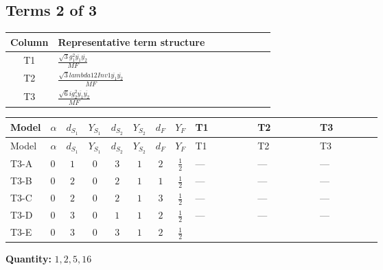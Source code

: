 \documentclass[8pt]{article}
\begin{document}
\begin{landscape}
\subsection*{Terms 2 of 3}
\begin{center}
\begin{tabular}{@{}c >{\raggedright\arraybackslash}p{0.82\linewidth}@{}}
\toprule
Column & Representative term structure \\
\midrule
T1 & \(\displaystyle \frac{\sqrt{3} g_{1}^{2} \overline{y_{1}} \overline{y_{2}}}{MF}\) \\
\midrule
T2 & \(\displaystyle \frac{\sqrt{3} lambda12Inv1 \overline{y_{1}} \overline{y_{2}}}{MF}\) \\
\midrule
T3 & \(\displaystyle \frac{\sqrt{6} i g_{2}^{2} \overline{y_{1}} \overline{y_{2}}}{MF}\) \\
\midrule
\bottomrule
\end{tabular}
\end{center}
\smallskip
\tiny
\begin{longtable}{@{}llcccccc >{\raggedright\arraybackslash}p{0.21\linewidth} >{\raggedright\arraybackslash}p{0.21\linewidth} >{\raggedright\arraybackslash}p{0.21\linewidth}@{}}
\toprule
Model & $\alpha$ & $d_{S_1}$ & $Y_{S_1}$ & $d_{S_2}$ & $Y_{S_2}$ & $d_F$ & $Y_F$ & T1 & T2 & T3 \\
\midrule
\endfirsthead
\toprule
Model & $\alpha$ & $d_{S_1}$ & $Y_{S_1}$ & $d_{S_2}$ & $Y_{S_2}$ & $d_F$ & $Y_F$ & T1 & T2 & T3 \\
\midrule
\endhead
T3-A & $0$ & $1$ & $0$ & $3$ & $1$ & $2$ & $\frac{1}{2}$ & --- & --- & --- \\
\midrule
T3-B & $0$ & $2$ & $0$ & $2$ & $1$ & $1$ & $\frac{1}{2}$ & --- & --- & --- \\
\midrule
T3-C & $0$ & $2$ & $0$ & $2$ & $1$ & $3$ & $\frac{1}{2}$ & --- & --- & --- \\
\midrule
T3-D & $0$ & $3$ & $0$ & $1$ & $1$ & $2$ & $\frac{1}{2}$ & --- & --- & --- \\
\midrule
T3-E & $0$ & $3$ & $0$ & $3$ & $1$ & $2$ & $\frac{1}{2}$ & \scriptsize\adjustbox{max width=\linewidth}{$\begin{gathered} - \frac{\sqrt{3} g_{1}^{2} \overline{y_{1}} \overline{y_{2}}}{8 MF}\end{gathered}$} & \scriptsize\adjustbox{max width=\linewidth}{$\begin{gathered} \frac{\sqrt{3} lambda12Inv1 \overline{y_{1}} \overline{y_{2}}}{6 MF}\end{gathered}$} & \scriptsize\adjustbox{max width=\linewidth}{$\begin{gathered} - \frac{\sqrt{6} i g_{2}^{2} \overline{y_{1}} \overline{y_{2}}}{6 MF}\end{gathered}$} \\
\midrule
\bottomrule
\end{longtable}
\clearpage
\noindent\textbf{Quantity: }$\mathrm{1,2,5,16}$\par\smallskip

\end{landscape}
\end{document}
